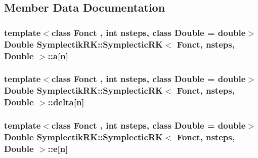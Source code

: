 \subsection{Member Data Documentation}
\hypertarget{classSymplectikRK_1_1SymplecticRK_a7f1fda76b67eb89dfc254d6b42a23504}{
\subsubsection[{a}]{\setlength{\rightskip}{0pt plus 5cm}template$<$class Fonct , int nsteps, class Double  = double$>$ Double {\bf Symplectik\-R\-K\-::\-Symplectic\-R\-K}$<$ Fonct, nsteps, Double $>$\-::a\mbox{[}{\bf n}\mbox{]}\hspace{0.3cm}{\ttfamily [private]}}}\label{classSymplectikRK_1_1SymplecticRK_a7f1fda76b67eb89dfc254d6b42a23504}
\hypertarget{classSymplectikRK_1_1SymplecticRK_a71df0793dfdd2f39391b683e4f5038b5}{
\subsubsection[{delta}]{\setlength{\rightskip}{0pt plus 5cm}template$<$class Fonct , int nsteps, class Double  = double$>$ Double {\bf Symplectik\-R\-K\-::\-Symplectic\-R\-K}$<$ Fonct, nsteps, Double $>$\-::delta\mbox{[}{\bf n}\mbox{]}\hspace{0.3cm}{\ttfamily [private]}}}\label{classSymplectikRK_1_1SymplecticRK_a71df0793dfdd2f39391b683e4f5038b5}
\hypertarget{classSymplectikRK_1_1SymplecticRK_aabc61ffa0b8d5280e52b5d3058908ece}{
\subsubsection[{e}]{\setlength{\rightskip}{0pt plus 5cm}template$<$class Fonct , int nsteps, class Double  = double$>$ Double {\bf Symplectik\-R\-K\-::\-Symplectic\-R\-K}$<$ Fonct, nsteps, Double $>$\-::e\mbox{[}{\bf n}\mbox{]}\hspace{0.3cm}{\ttfamily [private]}}}\label{classSymplectikRK_1_1SymplecticRK_aabc61ffa0b8d5280e52b5d3058908ece}
